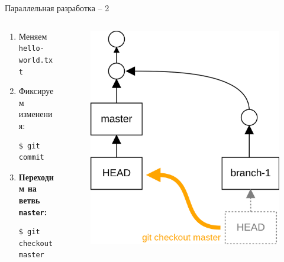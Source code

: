 \documentclass[presentation]{beamer}
\begin{document}
\begin{frame}[fragile]{Параллельная разработка -- 2}
  \begin{columns}
    \begin{column}{.5\textwidth}
      \begin{enumerate}
      \item Меняем \texttt{hello-world.txt}
      \item Фиксируем изменения:
\begin{verbatim}
$ git commit
\end{verbatim}
      \item \textbf{Переходим на ветвь \texttt{master}:}
\begin{verbatim}
$ git checkout master
\end{verbatim}
      \end{enumerate}
      \end{column}
      \begin{column}{.5\textwidth}
        \begin{figure}[htb]
          \centering
          \includegraphics[height=.7\textheight]{git-operation-branch-3}
        \end{figure}
      \end{column}
    \end{columns}
\end{frame}
\end{document}
